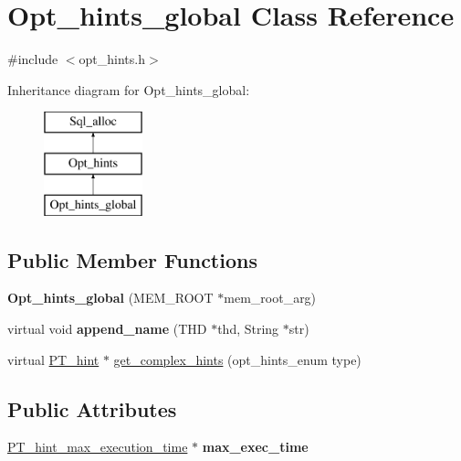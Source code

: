 \hypertarget{classOpt__hints__global}{}\section{Opt\+\_\+hints\+\_\+global Class Reference}
\label{classOpt__hints__global}


{\ttfamily \#include $<$opt\+\_\+hints.\+h$>$}

Inheritance diagram for Opt\+\_\+hints\+\_\+global\+:\begin{figure}[H]
\begin{center}
\leavevmode
\includegraphics[height=3.000000cm]{classOpt__hints__global}
\end{center}
\end{figure}
\subsection*{Public Member Functions}
\begin{DoxyCompactItemize}
\item 
\mbox{\label{classOpt__hints__global_a2277204779221d04a55318856c4f4a0e}} 
{\bfseries Opt\+\_\+hints\+\_\+global} (M\+E\+M\+\_\+\+R\+O\+OT $\ast$mem\+\_\+root\+\_\+arg)
\item 
\mbox{\label{classOpt__hints__global_a7f9c9da7d921a177fec79d00dd5f2d37}} 
virtual void {\bfseries append\+\_\+name} (T\+HD $\ast$thd, String $\ast$str)
\item 
virtual \mbox{\hyperlink{classPT__hint}{P\+T\+\_\+hint}} $\ast$ \mbox{\hyperlink{classOpt__hints__global_a7750a4f66503e4b91a924ad269f52fd9}{get\+\_\+complex\+\_\+hints}} (opt\+\_\+hints\+\_\+enum type)
\end{DoxyCompactItemize}
\subsection*{Public Attributes}
\begin{DoxyCompactItemize}
\item 
\mbox{\label{classOpt__hints__global_a76924dd6a4ee06c20566ca2affcaca70}} 
\mbox{\hyperlink{classPT__hint__max__execution__time}{P\+T\+\_\+hint\+\_\+max\+\_\+execution\+\_\+time}} $\ast$ {\bfseries max\+\_\+exec\+\_\+time}
\end{DoxyCompactItemize}
